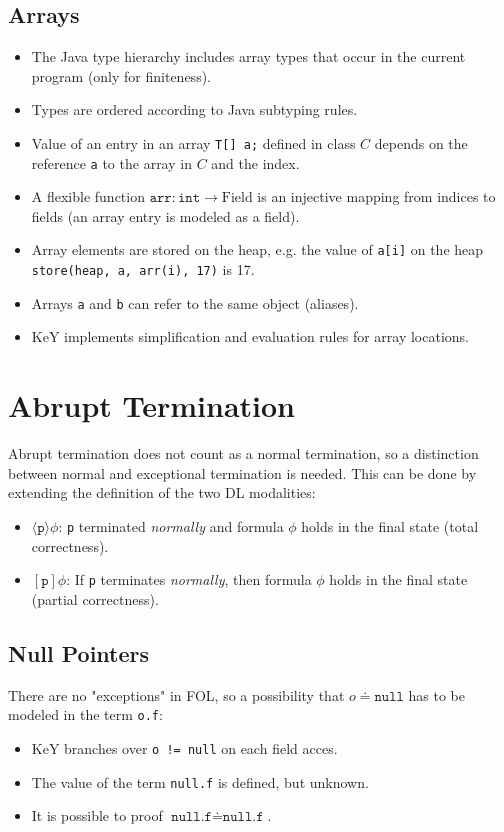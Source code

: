 		\subsection{Arrays}
			\begin{itemize}
				\item The Java type hierarchy includes array types that occur in the current program (only for finiteness).
				\item Types are ordered according to Java subtyping rules.
				\item Value of an entry in an array \texttt{T[] a;} defined in class \(C\) depends on the reference \texttt{a} to the array in \(C\) and the index.
				\item A flexible function \( \texttt{arr} : \texttt{int} \to \textrm{Field} \) is an injective mapping from indices to fields (an array entry is modeled as a field).
				\item Array elements are stored on the heap, e.g. the value of \texttt{a[i]} on the heap \texttt{store(heap, a, arr(i), 17)} is 17.
				\item Arrays \texttt{a} and \texttt{b} can refer to the same object (aliases).
				\item KeY implements simplification and evaluation rules for array locations.
			\end{itemize}
	
	\section{Abrupt Termination}
		Abrupt termination does not count as a normal termination, so a distinction between normal and exceptional termination is needed. This can be done by extending the definition of the two DL modalities:
		\begin{itemize}
			\item \( \langle \texttt{p} \rangle \phi \): \texttt{p} terminated \textit{normally} and formula \(\phi\) holds in the final state (total correctness).
			\item \( [\texttt{p}] \phi \): If \texttt{p} terminates \textit{normally}, then formula \(\phi\) holds in the final state (partial correctness).
		\end{itemize}
	
		\subsection{Null Pointers}
			There are no "exceptions" in FOL, so a possibility that \( o \doteq \texttt{null} \) has to be modeled in the term \texttt{o.f}:
			\begin{itemize}
				\item KeY branches over \texttt{o != null} on each field acces.
				\item The value of the term \texttt{null.f} is defined, but unknown.
				\item It is possible to proof \( \texttt{null.f} \doteq \texttt{null.f} \).
			\end{itemize}
		
